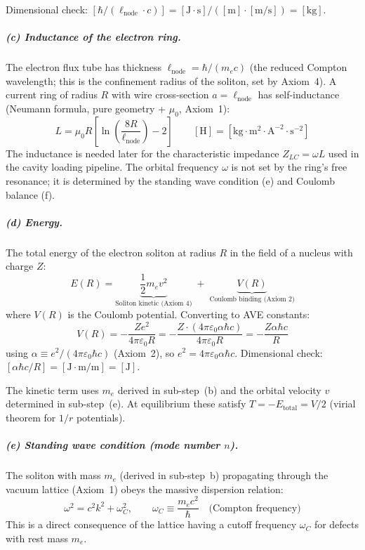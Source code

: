 Dimensional check:
$[\hbar / (\ell_{\text{node}} \cdot c)]
= [\text{J}\cdot\text{s}] / ([\text{m}] \cdot [\text{m/s}])
= [\text{kg}]$.\;\checkmark

\subparagraph{(c) Inductance of the electron ring.}
The electron flux tube has thickness
$\ell_{\text{node}} = \hbar / (m_e c)$ (the reduced
Compton wavelength; this is the confinement radius
of the soliton, set by Axiom~4).
A current ring of radius $R$ with wire cross-section
$a = \ell_{\text{node}}$ has self-inductance
(Neumann formula, pure geometry + $\mu_0$, Axiom~1):
\begin{equation}
    L = \mu_0 R \left[\ln\!\left(
    \frac{8R}{\ell_{\text{node}}}\right) - 2\right]
    \qquad [\text{H}] = [\text{kg}\cdot\text{m}^2
    \cdot\text{A}^{-2}\cdot\text{s}^{-2}]
    \label{eq:L_ring}
\end{equation}
The inductance is needed later for the characteristic
impedance $Z_{LC} = \omega L$ used in the cavity loading
pipeline.  The orbital frequency $\omega$ is not set
by the ring's free resonance; it is determined by the
standing wave condition (e) and Coulomb balance (f).

\subparagraph{(d) Energy.}
The total energy of the electron soliton at radius $R$ in the
field of a nucleus with charge $Z$:
\begin{equation}
    E(R) = \underbrace{\frac{1}{2}m_e v^2}_{
    \text{Soliton kinetic (Axiom~4)}}
    \;+\;\underbrace{V(R)}_{
    \text{Coulomb binding (Axiom~2)}}
    \label{eq:E_single}
\end{equation}
where $V(R)$ is the Coulomb potential.  Converting to
AVE constants:
\begin{equation}
    V(R) = -\frac{Ze^2}{4\pi\varepsilon_0 R}
    = -\frac{Z \cdot (4\pi\varepsilon_0 \alpha \hbar c)}
    {4\pi\varepsilon_0 R}
    = -\frac{Z\alpha\hbar c}{R}
    \label{eq:V_coulomb}
\end{equation}
using $\alpha \equiv e^2/(4\pi\varepsilon_0\hbar c)$
(Axiom~2), so $e^2 = 4\pi\varepsilon_0 \alpha\hbar c$.
Dimensional check: $[\alpha\hbar c / R]
= [\text{J}\cdot\text{m}/\text{m}] = [\text{J}]$.
\checkmark

The kinetic term uses $m_e$ derived in sub-step~(b)
and the orbital velocity $v$ determined in sub-step~(e).
At equilibrium these satisfy $T = -E_{\text{total}} = V/2$
(virial theorem for $1/r$ potentials).

\subparagraph{(e) Standing wave condition (mode number $n$).}

The soliton with mass $m_e$ (derived in sub-step~b)
propagating through the vacuum lattice (Axiom~1)
obeys the massive dispersion relation:
\begin{equation}
    \omega^2 = c^2 k^2 + \omega_C^2, \qquad
    \omega_C \equiv \frac{m_e c^2}{\hbar}
    \quad\text{(Compton frequency)}
    \label{eq:soliton_dispersion}
\end{equation}
This is a direct consequence of the lattice having a
cutoff frequency $\omega_C$ for defects with rest mass $m_e$.

